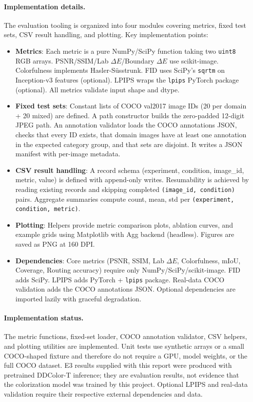 \documentclass{FastFyp}
\begin{document}
\paragraph{Implementation details.}
The evaluation tooling is organized into four modules covering metrics, fixed test sets, CSV result handling, and plotting. Key implementation points:
\begin{itemize}
    \item \textbf{Metrics}: Each metric is a pure NumPy/SciPy function taking two \texttt{uint8} RGB arrays. PSNR/SSIM/Lab $\Delta E$/Boundary $\Delta E$ use scikit-image. Colorfulness implements Hasler-Süsstrunk. FID uses SciPy's \texttt{sqrtm} on Inception-v3 features (optional). LPIPS wraps the \texttt{lpips} PyTorch package (optional). All metrics validate input shape and dtype.
    \item \textbf{Fixed test sets}: Constant lists of COCO val2017 image IDs (20 per domain + 20 mixed) are defined. A path constructor builds the zero-padded 12-digit JPEG path. An annotation validator loads the COCO annotations JSON, checks that every ID exists, that domain images have at least one annotation in the expected category group, and that sets are disjoint. It writes a JSON manifest with per-image metadata.
    \item \textbf{CSV result handling}: A record schema (experiment, condition, image\_id, metric, value) is defined with append-only writes. Resumability is achieved by reading existing records and skipping completed \texttt{(image\_id, condition)} pairs. Aggregate summaries compute count, mean, std per \texttt{(experiment, condition, metric)}.
    \item \textbf{Plotting}: Helpers provide metric comparison plots, ablation curves, and example grids using Matplotlib with Agg backend (headless). Figures are saved as PNG at 160 DPI.
    \item \textbf{Dependencies}: Core metrics (PSNR, SSIM, Lab $\Delta E$, Colorfulness, mIoU, Coverage, Routing accuracy) require only NumPy/SciPy/scikit-image. FID adds SciPy. LPIPS adds PyTorch + \texttt{lpips} package. Real-data COCO validation adds the COCO annotations JSON. Optional dependencies are imported lazily with graceful degradation.
\end{itemize}

\paragraph{Implementation status.}
The metric functions, fixed-set loader, COCO annotation validator, CSV helpers,
and plotting utilities are implemented. Unit tests use synthetic arrays or a
small COCO-shaped fixture and therefore do not require a GPU, model weights,
or the full COCO dataset. E3 results supplied with this report were produced
with pretrained DDColor-T inference; they are evaluation results, not evidence
that the colorization model was trained by this project. Optional LPIPS and
real-data validation require their respective external dependencies and data.
\end{document}
